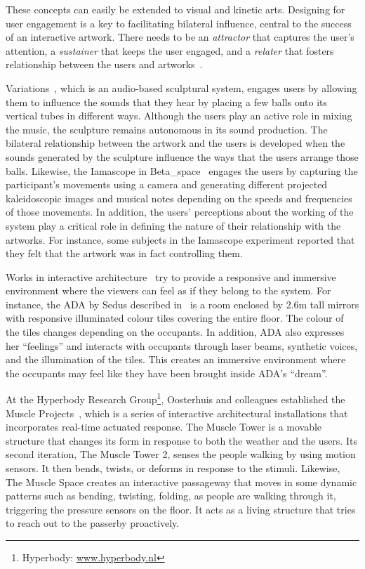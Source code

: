These concepts can easily be extended to visual and kinetic arts. Designing for user engagement is a key to facilitating bilateral influence, central to the success of an interactive artwork. There needs to be an \textit{attractor} that captures the user's attention, a \textit{sustainer} that keeps the user engaged, and a \textit{relater} that fosters relationship between the users and artworks~\cite{Edmonds2006}. 

Variations~\cite{Wands2005}, which is an audio-based sculptural system, engages users by allowing them to influence the sounds that they hear by placing a few balls onto its vertical tubes in different ways. Although the users play an active role in mixing the music, the sculpture remains autonomous in its sound production. The bilateral relationship between the artwork and the users is developed when the sounds generated by the sculpture influence the ways that the users arrange those balls. 
Likewise, the Iamascope in Beta\_space~\cite{Costello2005} engages the users by capturing the participant's movements using a camera and generating different projected kaleidoscopic images and musical notes depending on the speeds and frequencies of those movements. In addition, the users' perceptions about the working of the system play a critical role in defining the nature of their relationship with the artworks. For instance, some subjects in the Iamascope experiment reported that they felt that the artwork was in fact controlling them. 

Works in interactive architecture~\cite{Hangar.org}\cite{Fox2009} try to provide a responsive and immersive environment where the viewers can feel as if they belong to the system. For instance, the ADA by Sedus described in~\cite{Hangar.org} is a room enclosed by 2.6m tall mirrors with responsive illuminated colour tiles covering the entire floor. The colour of the tiles changes depending on the occupants. In addition, ADA also expresses her ``feelings'' and interacts with occupants through laser beams, synthetic voices, and the illumination of the tiles. This creates an immersive environment where the occupants may feel like they have been brought inside ADA's ``dream''. 

At the Hyperbody Research Group\footnote{Hyperbody: \url{www.hyperbody.nl}}, Oosterhuis and colleagues established the Muscle Projects~\cite{Oosterhuis2008}, which is a series of interactive architectural installations that incorporates real-time actuated response. The Muscle Tower is a movable structure that changes its form in response to both the weather and the users. Its second iteration, The Muscle Tower 2, senses the people walking by using motion sensors. It then bends, twists, or deforms in response to the stimuli. Likewise, The Muscle Space creates an interactive passageway that moves in some dynamic patterns such as bending, twisting, folding, as people are walking through it, triggering the pressure sensors on the floor. It acts as a living structure that tries to reach out to the passerby proactively.

